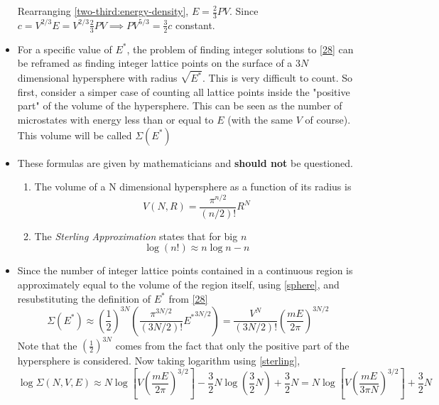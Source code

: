 \documentclass{article}
\begin{document}
\begin{itemize}
\begin{derivation}
        Rearranging \eqref{two-third:energy-density}, $E=\frac{2}{3}PV$. Since $c=V^{2/3}E=V^{2/3}\frac{2}{3}PV\implies PV^{5/3}=\frac{3}{2}c$ constant.
    \end{derivation}
    \item For a specific value of $E^*$, the problem of finding integer solutions to \eqref{28} can be reframed as finding integer lattice points on the surface of a $3N$ dimensional hypersphere with radius $\sqrt{E^*}$. This is very difficult to count. So first, consider a simper case of counting all lattice points inside the "positive part" of the volume of the hypersphere. This can be seen as the number of microstates with energy less than or equal to $E$ (with the same $V$ of course). This volume will be called $\Sigma(E^*)$
    \item These formulas are given by mathematicians and \textbf{should not} be questioned.
    \begin{enumerate}
        \item The volume of a N dimensional hypersphere as a function of its radius is \begin{equation}
            V(N,R)=\frac{\pi^{n/2}}{(n/2)!}R^N\label{sphere}
        \end{equation}
        \item The \textit{Sterling Approximation} states that for big $n$ \begin{equation}
            \log (n!)\approx n\log n-n\label{sterling}
        \end{equation}
    \end{enumerate}
    \item Since the number of integer lattice points contained in a continuous region is approximately equal to the volume of the region itself, using \eqref{sphere}, and resubstituting the definition of $E^*$ from \eqref{28}
    \begin{equation}
        \Sigma(E^*)\approx\left(\frac{1}{2}\right)^{3N}\left(\frac{\pi^{3N/2}}{(3N/2)!}{E^*}^{3N/2}\right)=\frac{V^N}{(3N/2)!}\left(\frac{mE}{2\pi}\right)^{3N/2}
    \end{equation}
    Note that the $\left(\frac{1}{2}\right)^{3N}$ comes from the fact that only the positive part of the hypersphere is considered. Now taking logarithm using \eqref{sterling}, \begin{equation}
        \log\Sigma(N,V,E)\approx N\log\left[V\left(\frac{mE}{2\pi}\right)^{3/2}\right]-\frac{3}{2}N\log\left(\frac{3}{2}N\right)+\frac{3}{2}N=N\log\left[V\left(\frac{mE}{3\pi N}\right)^{3/2}\right]+\frac{3}{2}N\label{34}

\end{equation}
\end{itemize}
\end{document}
